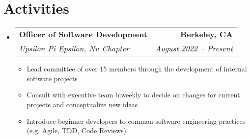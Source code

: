 \documentclass[letterpaper,11pt]{article}
\makeatletter
\newcommand{\resumeItem}[1]{
  \item\small{
    {#1 \vspace{-2pt}}
  }
}
\newcommand{\resumeSubheading}[4]{
  \vspace{-2pt}\item
    \begin{tabular*}{0.97\textwidth}[t]{l@{\extracolsep{\fill}}r}
      \textbf{#1} & #2 \\
      \textit{\small#3} & \textit{\small #4} \\
    \end{tabular*}\vspace{-7pt}
}
\newcommand{\resumeSubHeadingListStart}{\begin{itemize}[leftmargin=0.15in, label={}]}
\newcommand{\resumeSubHeadingListEnd}{\end{itemize}}
\newcommand{\resumeItemListStart}{\begin{itemize}}
\newcommand{\resumeItemListEnd}{\end{itemize}\vspace{-5pt}}
\makeatother
\begin{document}
\section{\textbf{Activities}}
  \resumeSubHeadingListStart

    \resumeSubheading
      {Officer of Software Development}{\textbf{Berkeley, CA}}
      {Upsilon Pi Epsilon, Nu Chapter}{August 2022 -- Present}
      \resumeItemListStart
        \resumeItem{Lead committee of over 15 members through the development of internal software projects}
        \resumeItem{Consult with executive team biweekly to decide on changes for current projects and conceptualize new ideas}
        \resumeItem{Introduce beginner developers to common software engineering practices (e.g. Agile, TDD, Code Reviews)}
      \resumeItemListEnd

  \resumeSubHeadingListEnd
\end{document}
